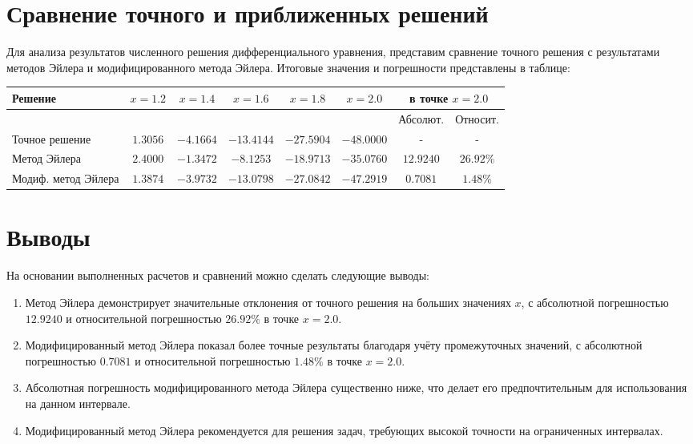 \documentclass[a4paper,12pt]{article}
\begin{document}
\section*{Сравнение точного и приближенных решений}
Для анализа результатов численного решения дифференциального уравнения, представим сравнение точного решения с результатами методов Эйлера и модифицированного метода Эйлера. Итоговые значения и погрешности представлены в таблице:

\begin{tabular}{|>{\centering\arraybackslash}p{1.6cm}|c|c|c|c|c|c|c|}
    \hline
    Решение & $x=1.2$ & $x=1.4$ & $x=1.6$ & $x=1.8$ & $x=2.0$ & \multicolumn{2}{|c|}{в точке $x=2.0$} \\
    \cline{7-8}
             &           &           &           &           &           & Абсолют. & Относит. \\
    \hline
    Точное решение & $1.3056$ & $-4.1664$ & $-13.4144$ & $-27.5904$ & $-48.0000$ & - & - \\ \hline
    Метод Эйлера & $2.4000$ & $-1.3472$ & $-8.1253$ & $-18.9713$ & $-35.0760$ & $12.9240$ & $26.92\%$ \\ \hline
    Модиф. метод Эйлера & $1.3874$ & $-3.9732$ & $-13.0798$ & $-27.0842$ & $-47.2919$ & $0.7081$ & $1.48\%$ \\ \hline
\end{tabular}


\section*{Выводы}
На основании выполненных расчетов и сравнений можно сделать следующие выводы:
\begin{enumerate}
    \item Метод Эйлера демонстрирует значительные отклонения от точного решения на больших значениях $x$, с абсолютной погрешностью $12.9240$ и относительной погрешностью $26.92\%$ в точке $x=2.0$.
    \item Модифицированный метод Эйлера показал более точные результаты благодаря учёту промежуточных значений, с абсолютной погрешностью $0.7081$ и относительной погрешностью $1.48\%$ в точке $x=2.0$.
    \item Абсолютная погрешность модифицированного метода Эйлера существенно ниже, что делает его предпочтительным для использования на данном интервале.
    \item Модифицированный метод Эйлера рекомендуется для решения задач, требующих высокой точности на ограниченных интервалах.
\end{enumerate}
\end{document}
